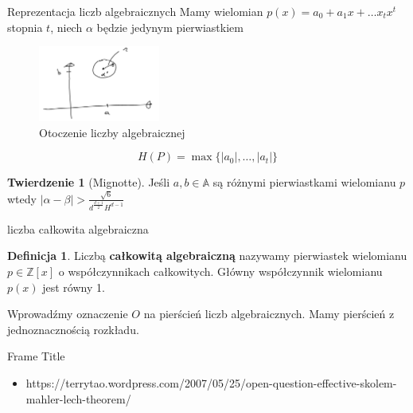 \documentclass[handout]{beamer}
\def\Z{\mathbb Z}
\def\A{\mathbb{A}}
\theoremstyle{definition}
\newtheorem*{definicja}{Definicja}
\newtheorem*{twierdzenie}{Twierdzenie}
\theoremstyle{named}
\begin{document}
\begin{frame}{Reprezentacja liczb algebraicznych }
    Mamy wielomian $p(x) = a_0 + a_1 x + \ldots x_{t} x^{t}$ stopnia $t$, niech $\alpha$ będzie jedynym pierwiastkiem  
    \begin{figure}
        \centering
        \includegraphics[width=40mm]{img/Zaznaczenie_082.png}
        \caption{Otoczenie liczby algebraicznej}
        \label{fig:my_label}
    \end{figure}
    $$H(P) = \max \{ |a_0|, \ldots, |a_t| \}$$
    \begin{twierdzenie}[Mignotte]
            Jeśli $a,b \in \A$ są różnymi pierwiastkami wielomianu $p$ wtedy 
            $|\alpha - \beta| > \frac{\sqrt{6}}{d^{\frac{d+1}{2}} H^{d-1}}$
    \end{twierdzenie}
    
\end{frame}


\begin{frame}{liczba całkowita algebraiczna}
    \begin{definicja}
        Liczbą \textbf{całkowitą algebraiczną} nazywamy pierwiastek wielomianu $p \in \Z[x]$ o współczynnikach całkowitych. Główny współczynnik wielomianu $p(x)$ jest równy 1. 
    \end{definicja}
    Wprowadźmy oznaczenie $O$ na pierścień liczb algebraicznych. Mamy pierścień z jednoznacznością rozkładu. 
\end{frame}

\begin{frame}{Frame Title}
    
\end{frame}


\begin{frame}


\begin{itemize}
    \item https://terrytao.wordpress.com/2007/05/25/open-question-effective-skolem-mahler-lech-theorem/
\end{itemize}
\end{frame}
\end{document}
